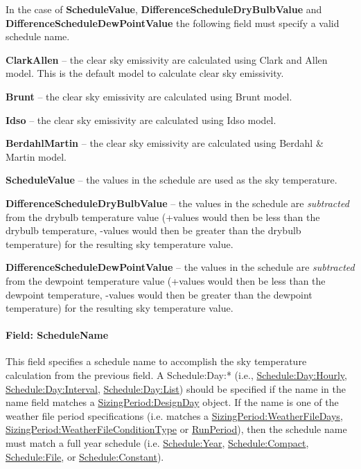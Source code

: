 In the case of \textbf{ScheduleValue}, \textbf{DifferenceScheduleDryBulbValue} and \textbf{DifferenceScheduleDewPointValue} the following field must specify a valid schedule name.

\textbf{ClarkAllen} -- the clear sky emissivity are calculated using Clark and Allen model. This is the default model to calculate clear sky emissivity.

\textbf{Brunt} -- the clear sky emissivity are calculated using Brunt model.

\textbf{Idso} -- the clear sky emissivity are calculated using Idso model.

\textbf{BerdahlMartin} -- the clear sky emissivity are calculated using Berdahl \& Martin model.

\textbf{ScheduleValue} -- the values in the schedule are used as the sky temperature.

\textbf{DifferenceScheduleDryBulbValue} -- the values in the schedule are \emph{subtracted} from the drybulb temperature value (+values would then be less than the drybulb temperature, -values would then be greater than the drybulb temperature) for the resulting sky temperature value.

\textbf{DifferenceScheduleDewPointValue} -- the values in the schedule are \emph{subtracted} from the dewpoint temperature value (+values would then be less than the dewpoint temperature, -values would then be greater than the dewpoint temperature) for the resulting sky temperature value.

\paragraph{Field: ScheduleName}\label{field-schedulename}

This field specifies a schedule name to accomplish the sky temperature calculation from the previous field. A Schedule:Day:* (i.e., \hyperref[scheduledayhourly]{Schedule:Day:Hourly}, \hyperref[scheduledayinterval]{Schedule:Day:Interval}, \hyperref[scheduledaylist]{Schedule:Day:List}) should be specified if the name in the name field matches a \hyperref[sizingperioddesignday]{SizingPeriod:DesignDay} object. If the name is one of the weather file period specifications (i.e. matches a \hyperref[sizingperiodweatherfiledays]{SizingPeriod:WeatherFileDays}, \hyperref[sizingperiodweatherfileconditiontype]{SizingPeriod:WeatherFileConditionType} or \hyperref[runperiod]{RunPeriod}), then the schedule name must match a full year schedule (i.e. \hyperref[scheduleyear]{Schedule:Year}, \hyperref[schedulecompact]{Schedule:Compact}, \hyperref[schedulefile]{Schedule:File}, or \hyperref[scheduleconstant]{Schedule:Constant}).

